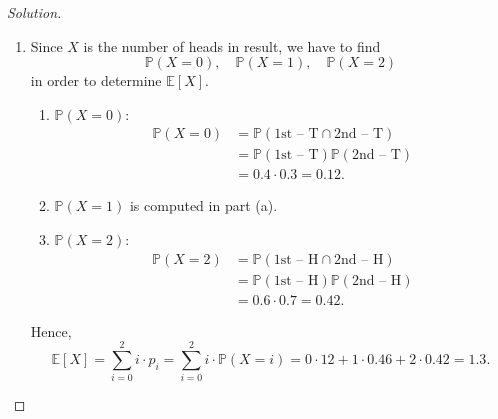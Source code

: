 \documentclass{article}[12pt]
\newenvironment{solution}
  {\renewcommand\qedsymbol{$\blacksquare$}\begin{proof}[Solution]}
  {\end{proof}}
\renewcommand{\P}{\mathbb{P}}
\newcommand{\E}{\mathbb{E}}
\begin{document}
\begin{solution}
\begin{enumerate}[label=(\alph*)]
    \item Since $X$ is the number of heads in result, we have to find
    \begin{equation*}
        \P(X = 0),\quad\P(X = 1),\quad\P(X = 2)
    \end{equation*}
    in order to determine $\E[X]$.
    \begin{enumerate}[label=(b.\arabic*)]
        \item $\P(X = 0)$:
        \begin{align*}
            \P(X = 0) &= \P(\text{1st -- T}\cap\text{2nd -- T})
            \\
            &=\P(\text{1st -- T})\P(\text{2nd -- T})
            \\
            &=0.4\cdot 0.3 = 0.12.
        \end{align*}
        \item $\P(X = 1)$ is computed in part (a).
        \item $\P(X = 2)$:
        \begin{align*}
            \P(X = 2) &= \P(\text{1st -- H}\cap\text{2nd -- H})
            \\
            &=\P(\text{1st -- H})\P(\text{2nd -- H})
            \\
            &=0.6\cdot 0.7 = 0.42.
        \end{align*}
    \end{enumerate}
    Hence,
    \begin{equation*}
        \E[X] = \sum_{i=0}^{2}i\cdot p_{i} = \sum_{i=0}^{2}i\cdot\P(X=i) = 0\cdot 12 + 1\cdot 0.46 + 2\cdot 0.42 = 1.3.
    \end{equation*}
\end{enumerate}
\end{solution}
\end{document}
